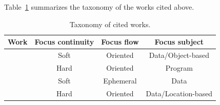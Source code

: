 \documentclass[11pt]{article}
\begin{document}
Table~\ref{tab:tx} summarizes the taxonomy of the works cited above.
\begin{table}[H]
\centering
\caption{\small Taxonomy of cited works.}
    \begin{tabular}{|c|c|c|c|}
	\hline
     Work & Focus continuity & Focus flow & Focus subject\\
    \hline~\cite{ref:show-attend-tell} & Soft & Oriented & Data/Object-based\\
    \hline~\cite{ref:act} & Hard & Oriented & Program\\
    \hline~\cite{ref:act} & Soft & Ephemeral & Data\\
    \hline~\cite{ref:ram} & Hard & Oriented & Data/Location-based\\
    \hline
\end{tabular}\label{tab:tx}
\end{table}

\printbibliography
\end{document}
